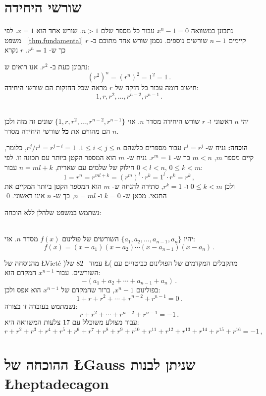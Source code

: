
\section{שורשי היחידה}\label{s.roots}

נתבונן במשוואה
$x^{n}-1=0$
עבור כל מספר שלם
$n>	 1$.
שורש אחד הוא
$x=1$.
לפי משפט~%
\ref{thm.fundamental}
קיימים
$n-1$
שורשים נוספים. נסמן שורש אחד מתוכם ב-%
$r$
כך ש-%
$r^{n}=1$.
$r$
נקרא

נתבונן כעת ב-%
$r^2$.
אנו רואים ש:
\[
(r^2)^n=(r^{n})^2=1^2=1\,.
\]
חישוב דומה עבור כל חזקה של
$r$
מראה שכל החזקות הם שורשי היחידה:
\[
1, r, r^2, \ldots, r^{n-2}, r^{n-1}\,.
\]



\begin{theorem}\label{thm.roots-of-unity}\mbox{}\\
יהי
$n$
ראשוני ו-%
$r$
שורש היחידה מסדר 
$n$.
אזי
$\{1,r,r^2,\ldots,r^{n-2},r^{n-1}\}$
שונים זה מזה ולכן הם מהווים את 
\textbf{כל}
שורשי היחידה מסדר
$n$.
\end{theorem}
\textbf{הוכחה:}
נניח ש-%
$r^i=r^j$
עבור מספרים כלשהם
$1\leq i<j\leq n$.
$r^j/r^i=r^{j-i}=1$,
כלומר, קיים מספר
$m$,
$m<n$
כך ש-%
$r^m=1$.
נניח ש-%
$m$
הוא המספר הקטן ביותר עם תכונה זו. 
לפי חילוק של שלמים עם שארית,
$n=ml+k$
עבור
$0<l<n$,
$0\leq k<m$:
\[
1=r^n=r^{ml+k}=(r^m)^l\cdot r^k=1^l\cdot r^k=r^k\,,
\]
ולכן 
$0\leq k<m$ 
ו-%
$r^k=1$,
סתירה להנחה ש-%
$m$
הוא המספר הקטן ביותר המקיים את התנאי. מכאן ש-%
$k=0$
ו-%
$n=ml$,
כך ש-%
$n$
אינו ראשוני.
\qed

נשתמש במשפט שלהלן ללא הוכחה:
\begin{theorem}\mbox{}\\
יהיו
$\{a_1,a_2,\ldots,a_{n-1},a_n\}$
השורשים של פולינום
$f(x)$
מסדר
$n$.
אזי:
\[
f(x) =(x-a_1) (x-a_2)\cdots (x-a_{n-1})(x-a_n)\,.
\]
\end{theorem}



מהנוסחה של
\L{Viet\'{e}}
)עמוד~%
$82$ 
של
\L{\cite{jorg}}(
מתקבלים המקדמים של הפולינום כביטויים עם השורשים. עבור
$x^{n-1}$
המקדם הוא:
\[
-(a_1+a_2+\cdots+a_{n-1}+a_n)\,.
\]
בפולינום
$x^n-1$,
ברור שהמקדם של 
$x^{n-1}$
הוא אפס ולכן:
\[
1+r+r^2+\cdots + r^{n-2}+r^{n-1}=0\,.
\]
נשמתמש בעובדה זו בצורה:
\[
r+r^2+\cdots + r^{n-2}+r^{n-1}=-1\,.
\]
עבור מצולע משוכלל עם 
$17$
צלעות המשוואה היא:
\[
r+r^2+r^3+r^4+r^5+r^6+r^7+r^8+r^9+r^{10}+r^{11}+r^{12}+r^{13}+r^{14} + r^{15}+r^{16}=-1\,,
\]

\section{ההוכחה של 
\L{Gauss}
שניתן לבנות 
\L{heptadecagon}}\label{s.gauss}

